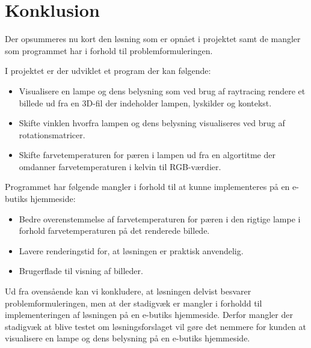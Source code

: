 \section{Konklusion}

Der opsummeres nu kort den løsning som er opnået i projektet samt de mangler som programmet har i forhold til problemformuleringen. 

I projektet er der udviklet et program der kan følgende:
\begin{itemize}
\item Visualisere en lampe og dens belysning som ved brug af raytracing rendere et billede ud fra en 3D-fil der indeholder lampen, lyskilder og kontekst.
\item Skifte vinklen hvorfra lampen og dens belysning visualiseres ved brug af rotationsmatricer. 
\item Skifte farvetemperaturen for pæren i lampen ud fra en algortitme der omdanner farvetemperaturen i kelvin til RGB-værdier. 
\end{itemize}

Programmet har følgende mangler i forhold til at kunne implementeres på en e-butiks hjemmeside:
\begin{itemize}
\item Bedre overenstemmelse af farvetemperaturen for pæren i den rigtige lampe i forhold farvetemperaturen på det renderede billede.
\item Lavere renderingstid for, at løsningen er praktisk anvendelig.
\item Brugerflade til visning af billeder.
\end{itemize}

Ud fra ovensående kan vi konkludere, at løsningen delvist besvarer problemformuleringen, men at der stadigvæk er mangler i forholdd til implementeringen af løsningen på en e-butiks hjemmeside. Derfor mangler der stadigvæk at blive testet om løsningsforslaget vil gøre det nemmere for kunden at visualisere en lampe og dens belysning på en e-butiks hjemmeside.  

\clearpage